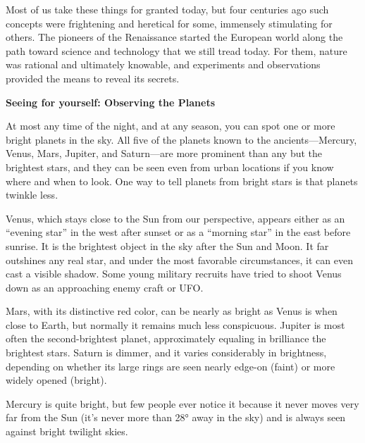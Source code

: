 \documentclass[../../main-astronomy.tex]{subfiles}
\begin{document}
\vspace{1em}

Most of us take these things for granted today, but four centuries ago such concepts were frightening and heretical for some, immensely stimulating for others. The pioneers of the Renaissance started the European world along the path toward science and technology that we still tread today. For them, nature was rational and ultimately knowable, and experiments and observations provided the means to reveal its secrets.

\begin{mdframed}[backgroundcolor=black!10]
    \textbf{Seeing for yourself: Observing the Planets}

    \vspace{1ex}

    At most any time of the night, and at any season, you can spot one or more bright planets in the sky. All five of the planets known to the ancients---Mercury, Venus, Mars, Jupiter, and Saturn---are more prominent than any but the brightest stars, and they can be seen even from urban locations if you know where and when to look. One way to tell planets from bright stars is that planets twinkle less.

    \vspace{1em}

    Venus, which stays close to the Sun from our perspective, appears either as an ``evening star'' in the west after sunset or as a ``morning star'' in the east before sunrise. It is the brightest object in the sky after the Sun and Moon. It far outshines any real star, and under the most favorable circumstances, it can even cast a visible shadow. Some young military recruits have tried to shoot Venus down as an approaching enemy craft or UFO.

    \vspace{1em}
    
    Mars, with its distinctive red color, can be nearly as bright as Venus is when close to Earth, but normally it remains much less conspicuous. Jupiter is most often the second-brightest planet, approximately equaling in brilliance the brightest stars. Saturn is dimmer, and it varies considerably in brightness, depending on whether its large rings are seen nearly edge-on (faint) or more widely opened (bright).

    \vspace{1em}
    
    Mercury is quite bright, but few people ever notice it because it never moves very far from the Sun (it's never more than \ang{28} away in the sky) and is always seen against bright twilight skies.


\end{mdframed}
\end{document}
